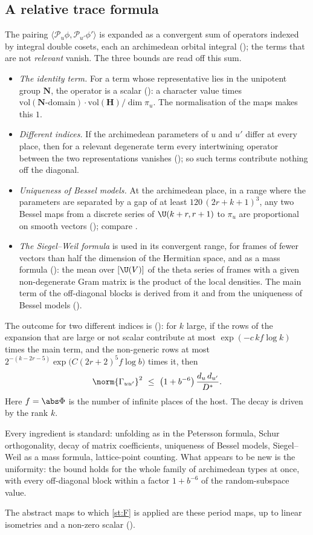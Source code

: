\subsection{A relative trace formula}
The pairing $\langle\mathcal P_u\phi,\mathcal P_{u'}\phi'\rangle$ is expanded as a convergent sum of operators
indexed by integral double cosets, each an archimedean orbital integral \lvS{}
(); the terms that are not \emph{relevant} vanish. The three bounds are read
off this sum.
\begin{itemize}
\item \emph{The identity term.} For a term whose representative lies in the unipotent group
  $\mathbf N$, the operator is a scalar \lvS{} (): a character value times
  $\mathrm{vol}(\mathbf N\text{-domain})\cdot\mathrm{vol}(\mathbf H)/\dim\pi_u$. The normalisation of the maps
  makes this $1$.
\item \emph{Different indices.} If the archimedean parameters of $u$ and $u'$ differ at every
  place, then for a relevant degenerate term every intertwining operator between the two
  representations vanishes \lvS{} (); so such terms contribute nothing off the
  diagonal.
\item \emph{Uniqueness of Bessel models.} At the archimedean place, in a range where the
  parameters are separated by a gap of at least $120\,(2r+k+1)^3$, any two Bessel maps from a
  discrete series of $\U(k+r,r+1)$ to $\pi_u$ are proportional on smooth vectors \lvS{}
  (); compare \cite{sunzhu2012,jsz2010}.
\item \emph{The Siegel--Weil formula} is used in its convergent range, for frames of fewer
  vectors than half the dimension of the Hermitian space, and as a mass
  formula \lvS{} (): the mean over $[\U(V)]$ of the theta series of
  frames with a given non-degenerate Gram matrix is the product of the local densities. The
  main term of the off-diagonal blocks is derived from it and from the uniqueness of Bessel
  models ().
\end{itemize}
The outcome for two different indices is \lvS{} (): for $k$ large, if the
rows of the expansion that are large or not scalar contribute at most
$\exp(-c\,kf\log k)$ times the main term, and the non-generic rows at most
$2^{-(k-2r-5)}\exp\bigl(C(2r+2)^5f\log b\bigr)$ times it, then
\[
\norm{\Gamma_{uu'}}^2\ \le\ \bigl(1+b^{-6}\bigr)\,\frac{d_u\,d_{u'}}{D^*}.
\]
Here $f=\abs\Phi$ is the number of infinite places of the host. The decay is driven by the rank $k$.

Every ingredient is standard: unfolding as in the Petersson formula, Schur orthogonality,
decay of matrix coefficients, uniqueness of Bessel models, Siegel--Weil as a mass formula,
lattice-point counting. What appears to be new is the uniformity: the bound holds for the whole
family of archimedean types at once, with every off-diagonal block within a factor $1+b^{-6}$
of the random-subspace value.

The abstract maps to which \cref{st:F} is applied are these period maps, up to linear
isometries and a non-zero scalar \lvS{} ().
